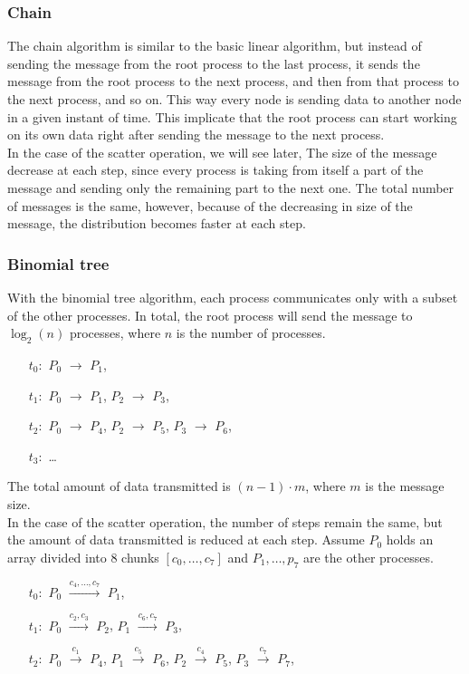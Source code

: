 \subsubsection{Chain}
    The chain algorithm is similar to the basic linear algorithm, but
    instead of sending the message from the root process to the last
    process, it sends the message from the root process to the next
    process, and then from that process to the next process, and so on.
    This way every node is sending data to another node in a given
    instant of time. This implicate that the root process can start
    working on its own data right after sending the message to the
    next process. \\
    In the case of the scatter operation, we will see later,
    The size of the message decrease at each step, since every
    process is taking from itself a part of the message and sending
    only the remaining part to the next one. The total number of messages
    is the same, however, because of the decreasing in size of the
    message, the distribution becomes faster at each step. 

\subsubsection{Binomial tree}
    With the binomial tree algorithm, each process communicates
    only with a subset of the other processes. In total, the root
    process will send the message to $\log_2(n)$ processes, where
    $n$ is the number of processes. 
    \begin{enumerate}
        \item[$t_0:$] $P_0$ $\rightarrow$ $P_1$,
        \item[$t_1:$] $P_0$ $\rightarrow$ $P_1$, $P_2$ $\rightarrow$ $P_3$,
        \item[$t_2:$] $P_0$ $\rightarrow$ $P_4$, $P_2$ $\rightarrow$ $P_5$, $P_3$ $\rightarrow$ $P_6$,
        \item[$t_3:$] \dots
    \end{enumerate}
    The total amount of data transmitted is $(n-1) \cdot m$, where
    $m$ is the message size. \\
    In the case of the scatter operation, the number of steps
    remain the same, but the amount of data transmitted
    is reduced at each step. Assume $P_0$ holds an array divided
    into $8$ chunks $[ c_0, \dots, c_7 ]$ and $P_1, \dots, p_7$ are
    the other processes.
    \begin{enumerate}
        \item[$t_0:$] $P_0$ $\xrightarrow{c_4,\dots,c_7}$ $P_1$,
        \item[$t_1:$] $P_0$ $\xrightarrow{c_2,c_3}$ $P_2$, $P_1$ $\xrightarrow{c_6,c_7}$ $P_3$,
        \item[$t_2:$] $P_0$ $\xrightarrow{c_1}$ $P_4$, $P_1$ $\xrightarrow{c_5}$ $P_6$, $P_2$ $\xrightarrow{c_4}$ $P_5$, $P_3$ $\xrightarrow{c_7}$ $P_7$,
    \end{enumerate}

